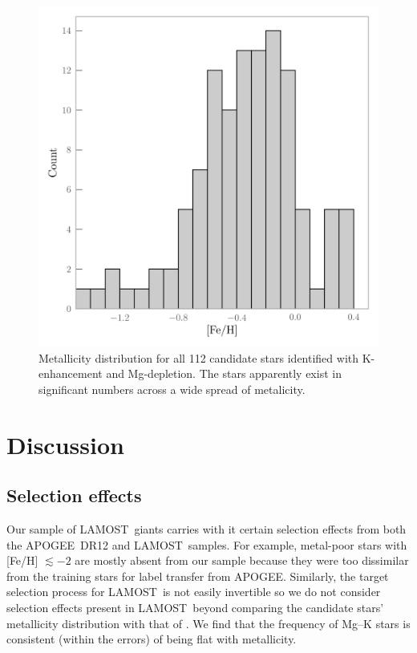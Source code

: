 \documentclass[a4paper,fleqn,usenatbib]{mnras}
\newcommand{\project}[1]{#1}
\newcommand{\lamost}{\project{LAMOST}}
\newcommand{\apogee}{\project{APOGEE}}
\begin{document}
\begin{figure}
	\includegraphics[width=\columnwidth]{mhist.png}
    \caption{Metallicity distribution for all 112 candidate stars identified with K-enhancement and Mg-depletion. The stars apparently exist in significant numbers across a wide spread of metalicity.}
    \label{mhist}
\end{figure}


\section{Discussion}
\label{sec:discussion}

\subsection{Selection effects}
\label{sec:selectioneffects}

Our sample of \lamost\ giants carries with it certain selection effects from both the \apogee\ DR12 and \lamost\ samples. For example, metal-poor stars with [Fe/H] $\lesssim-2$ are mostly absent from our sample because they were too dissimilar from the training stars for label transfer from \apogee. Similarly, the target selection process for \lamost\ is not easily invertible so we do not consider selection effects present in \lamost\ beyond comparing the candidate stars' metallicity distribution with that of \cite{ho2017}. We find that the frequency of Mg--K stars is consistent (within the errors) of being flat with metallicity. 
\end{document}
